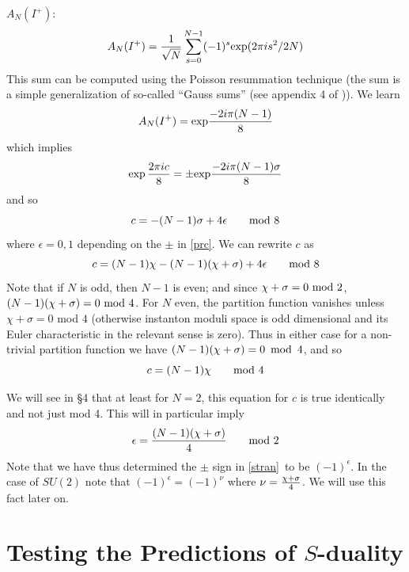\documentclass[12pt]{article}
\numberwithin{equation}{section}
\begin{document}
$A_N(I^+)$:
%
$$A_N(I^+)={1\over \sqrt{N}}\sum_{s=0}^{N-1}(-1)^s {\rm exp}(2\pi i s^2/2N)$$
%
This sum can be computed using the Poisson resummation technique (the sum is
  a simple generalization of so-called ``Gauss sums''
  (see appendix 4
of \cite{husmil})).  We learn
%
\begin{equation}
  \label{gnm}
  A_N(I^+)={\rm exp}{-2i\pi (N-1)\over 8}
\end{equation}
%
which implies
%
\begin{equation}
  \label{prc}
  \exp{2\pi i c\over 8}=\pm {\rm exp}{-2i \pi (N-1) \sigma \over 8}
\end{equation}
%
and so
%
$$c=-(N-1) \sigma+4 \epsilon \qquad {\rm mod}\ 8$$
%
where $\epsilon =0,1$ depending on the $\pm$ in \eqref{prc}.
%
We can rewrite $c$ as
%
$$c=(N-1)\chi -(N-1)(\chi +\sigma) +4\epsilon \qquad {\rm mod} \ 8$$
%
Note that if $N$ is odd, then $N-1$ is even; and
since $\chi+\sigma=0\ {\rm mod}\ 2$, $(N-1)(\chi +\sigma)=0\ {\rm mod}
\ 4$.
For $N$
even, the partition function
vanishes  unless $\chi+\sigma =0$ mod $4$ (otherwise
  instanton moduli space is odd dimensional
and its Euler characteristic in the relevant sense is zero).
Thus in either
case for a non-trivial partition function we have $(N-1)(\chi+\sigma)
=0 \,\,\,{\rm mod} \,\,\, 4$, and so
%
\begin{equation}
  \label{cchi}
  c=(N-1) \chi \qquad {\rm mod}\ 4
\end{equation}
%

We will see in \S4 that at least for $N=2$,
this equation for $c$ is true identically
and not just mod 4.  This will in particular imply
%
\begin{equation}
  \label{epi}
  \epsilon ={(N-1)(\chi+ \sigma)\over 4}\qquad {\rm mod}\  2
\end{equation}
%
Note that we have thus determined the $\pm$ sign in \eqref{stran}\
to be $(-1)^\epsilon$.  In the case of $SU(2)$ note
that $(-1)^\epsilon =(-1)^{\nu}$ where $\nu ={\chi+\sigma \over 4}$.
We will use this fact later on.

\section{Testing the Predictions of \texorpdfstring{$S$}{S}-duality}
\end{document}
